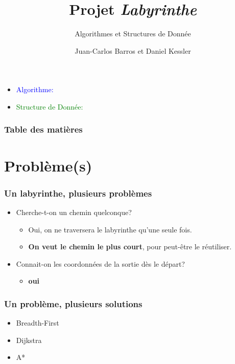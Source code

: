 \documentclass{beamer}
\title{Projet \textit{Labyrinthe}}
\subtitle{Algorithmes et Structures de Donnée}
\author{Juan-Carlos Barros et Daniel Kessler}
\begin{document}
\begin{frame}
  \titlepage
\end{frame}

\begin{frame}
  \par\bigskip
  \begin{itemize}
  \item<3->\textcolor{blue}{Algorithme:} 
  \item<3->\textcolor{green}{Structure de Donnée:} 
  \end{itemize}
\end{frame}

\begin{frame}
  \frametitle{Table des matières}
  \tableofcontents
\end{frame}

\section{Problème(s)}
\begin{frame}
  \frametitle{Un labyrinthe, plusieurs problèmes}
  \begin{itemize}
  \item Cherche-t-on un chemin quelconque?
    \begin{itemize}
    \item<2-> Oui, on ne traversera le labyrinthe qu'une seule fois.
    \item<2-> \textbf<4->{On veut le chemin le plus court}, pour peut-être le réutiliser.
    \end{itemize}
  \item Connait-on les coordonnées de la sortie dès le départ?
    \begin{itemize}
    \item<4-> \textbf{oui}
    \end{itemize}
  \end{itemize}
\end{frame}
\begin{frame}
  \frametitle{Un problème, plusieurs solutions}
  \begin{itemize}
  \item Breadth-First
  \item Dijkstra
  \item A*
  \end{itemize}
\end{frame}
\end{document}
